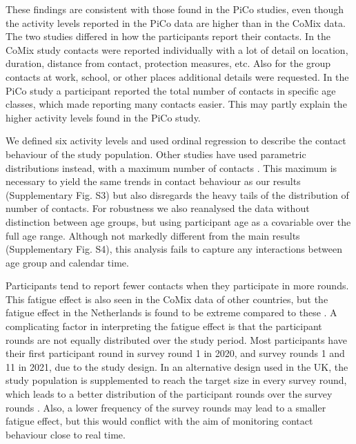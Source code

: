 \documentclass[fleqn,10pt]{wlscirep}
\begin{document}
These findings are consistent with those found in the PiCo studies, even though the activity levels reported in the PiCo data are higher than in the CoMix data. The two studies differed in how the participants report their contacts. In the CoMix study contacts were reported individually with a lot of detail on location, duration, distance from contact, protection measures, etc. Also for the group contacts at work, school, or other places additional details were requested. In the PiCo study a participant reported the total number of contacts in specific age classes, which made reporting many contacts easier. This may partly explain the higher activity levels found in the PiCo study.

We defined six activity levels and used ordinal regression to describe the contact behaviour of the study population. Other studies have used parametric distributions instead, with a maximum number of contacts \cite{Gimma_2022}. This maximum is necessary to yield the same trends in contact behaviour as our results (Supplementary Fig. S3) but also disregards the heavy tails of the distribution of number of contacts. For robustness we also reanalysed the data without distinction between age groups, but using participant age as a covariable over the full age range. Although not markedly different from the main results  (Supplementary Fig. S4), this analysis fails to capture any interactions between age group and calendar time.

Participants tend to report fewer contacts when they participate in more rounds. This fatigue effect is also seen in the CoMix data of other countries, but the fatigue effect in the Netherlands is found to be extreme compared to these \cite{Wong_2022b}. A complicating factor in interpreting the fatigue effect is that the participant rounds are not equally distributed over the study period. Most participants have their first participant round in survey round 1 in 2020, and survey rounds 1 and 11 in 2021, due to the study design. In an alternative design used in the UK, the study population is supplemented to reach the target size in every survey round, which leads to a better distribution of the participant rounds over the survey rounds \cite{Gimma_2022}. Also, a lower frequency of the survey rounds may lead to a smaller fatigue effect, but this would conflict with the aim of monitoring contact behaviour close to real time.
\end{document}
